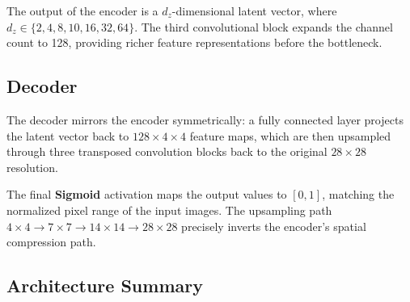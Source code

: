 \documentclass[12pt,a4paper]{article}
\begin{document}
\noindent The output of the encoder is a $d_z$-dimensional latent vector, where $d_z \in \{2, 4, 8, 10, 16, 32, 64\}$. The third convolutional block expands the channel count to 128, providing richer feature representations before the bottleneck.

\subsection{Decoder}

The decoder mirrors the encoder symmetrically: a fully connected layer projects the latent vector back to $128 \times 4 \times 4$ feature maps, which are then upsampled through three transposed convolution blocks back to the original $28\times28$ resolution.

\begin{table}[H]
  \centering
  \caption{Decoder Architecture}
  \label{tab:decoder}
  \renewcommand{\arraystretch}{1.35}
\end{table}

\noindent The final \textbf{Sigmoid} activation maps the output values to $[0,1]$, matching the normalized pixel range of the input images. The upsampling path $4\times4 \to 7\times7 \to 14\times14 \to 28\times28$ precisely inverts the encoder's spatial compression path.

\subsection{Architecture Summary}
\end{document}
